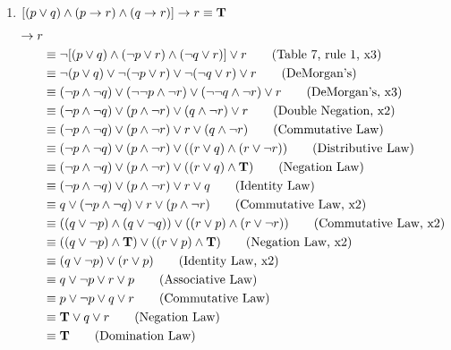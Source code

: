 \begin{questions}
\begin{solution}
\begin{enumerate}[label=(\alph*),itemsep=0pt,parsep=0pt,
topsep=0pt,partopsep=0pt]
    \item $[(p \vee q) \wedge (p \rightarrow r) \wedge (q \rightarrow r)] \rightarrow r \equiv \mathbf{T}$ 
    \begin{align*}
      [(p \vee q) &\wedge (p \ra r) \wedge (q \ra r)] \ra r \\
      &\equiv \neg[(p \vee q) \wedge (\neg p \vee r) \wedge (\neg q \vee r)] \vee r \tag{Table 7, rule 1, x3} \\
      &\equiv \neg(p \vee q) \vee \neg(\neg p \vee r) \vee \neg(\neg q \vee r) \vee r \tag{DeMorgan's} \\
      &\equiv (\neg p \wedge \neg q) \vee (\neg\neg p \wedge \neg r) \vee (\neg\neg q \wedge \neg r) \vee r \tag{DeMorgan's, x3} \\
      &\equiv (\neg p \wedge \neg q) \vee (p \wedge \neg r) \vee (q \wedge \neg r) \vee r \tag{Double Negation, x2} \\
      &\equiv (\neg p \wedge \neg q) \vee (p \wedge \neg r) \vee r \vee (q \wedge \neg r) \tag{Commutative Law} \\
      &\equiv (\neg p \wedge \neg q) \vee (p \wedge \neg r) \vee ((r \vee q) \wedge (r \vee \neg r)) \tag{Distributive Law} \\
      &\equiv (\neg p \wedge \neg q) \vee (p \wedge \neg r) \vee ((r \vee q) \wedge \mathbf{T}) \tag{Negation Law} \\
      &\equiv (\neg p \wedge \neg q) \vee (p \wedge \neg r) \vee r \vee q  \tag{Identity Law} \\
      &\equiv q \vee (\neg p \wedge \neg q) \vee r \vee (p \wedge \neg r) \tag{Commutative Law, x2} \\
      &\equiv ((q \vee \neg p) \wedge (q \vee \neg q)) \vee ((r \vee p) \wedge (r \vee \neg r)) \tag{Commutative Law, x2} \\
      &\equiv ((q \vee \neg p) \wedge \mathbf{T}) \vee ((r \vee p) \wedge \mathbf{T}) \tag{Negation Law, x2} \\
      &\equiv (q \vee \neg p) \vee (r \vee p)  \tag{Identity Law, x2} \\
      &\equiv q \vee \neg p \vee r \vee p  \tag{Associative Law} \\
      &\equiv p \vee  \neg p \vee q \vee r  \tag{Commutative Law} \\
      &\equiv \mathbf{T} \vee q \vee r  \tag{Negation Law} \\
      &\equiv \mathbf{T} \tag{Domination Law} \\
    \end{align*}


\end{enumerate}
\end{solution}
\end{questions}
